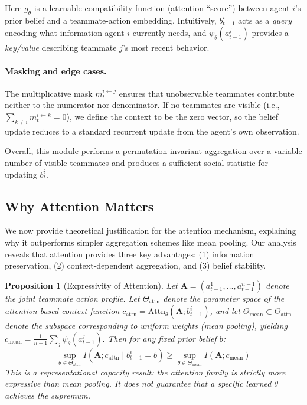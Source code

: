 \documentclass{article}
\theoremstyle{plain}
\newtheorem{proposition}[theorem]{Proposition}
\theoremstyle{definition}
\theoremstyle{remark}
\begin{document}
Here $g_\theta$ is a learnable compatibility function (attention ``score'') between agent $i$'s prior belief and a teammate-action embedding. Intuitively, $b_{t-1}^i$ acts as a \emph{query} encoding what information agent $i$ currently needs, and $\psi_\theta(a_{t-1}^j)$ provides a \emph{key/value} describing teammate $j$'s most recent behavior.

\paragraph{Masking and edge cases.}
The multiplicative mask $m_t^{i\leftarrow j}$ ensures that unobservable teammates contribute neither to the numerator nor denominator. If no teammates are visible (i.e., $\sum_{k\neq i} m_t^{i\leftarrow k}=0$), we define the context to be the zero vector, so the belief update reduces to a standard recurrent update from the agent's own observation.

Overall, this module performs a permutation-invariant aggregation over a variable number of visible teammates and produces a sufficient social statistic for updating $b_t^i$.

\subsection{Why Attention Matters}
\label{sec:theory_attention}

We now provide theoretical justification for the attention mechanism, explaining why it outperforms simpler aggregation schemes like mean pooling. Our analysis reveals that attention provides three key advantages: (1) information preservation, (2) context-dependent aggregation, and (3) belief stability.

\begin{proposition}[Expressivity of Attention]
\label{prop:info_preservation}
Let $\mathbf{A} = (a_{t-1}^1, \ldots, a_{t-1}^{n-1})$ denote the joint teammate action profile. Let $\Theta_{\mathrm{attn}}$ denote the parameter space of the attention-based context function $c_{\mathrm{attn}} = \mathrm{Attn}_\theta(\mathbf{A}; b_{t-1}^i)$, and let $\Theta_{\mathrm{mean}} \subset \Theta_{\mathrm{attn}}$ denote the subspace corresponding to uniform weights (mean pooling), yielding $c_{\mathrm{mean}} = \frac{1}{n-1}\sum_j \psi_\theta(a_{t-1}^j)$. Then for any fixed prior belief $b$:
\begin{equation}
\sup_{\theta \in \Theta_{\mathrm{attn}}} I(\mathbf{A}; c_{\mathrm{attn}} \mid b_{t-1}^i = b) \geq \sup_{\theta \in \Theta_{\mathrm{mean}}} I(\mathbf{A}; c_{\mathrm{mean}})
\end{equation}
This is a \emph{representational capacity} result: the attention family is strictly more expressive than mean pooling. It does not guarantee that a specific learned $\theta$ achieves the supremum.
\end{proposition}
\end{document}
